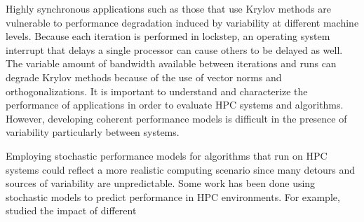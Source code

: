 \documentclass[num-refs]{wiley-article}
\begin{document}
Highly synchronous applications such as those that use Krylov methods are vulnerable to performance degradation induced by variability at different machine levels. 
Because each iteration is performed in lockstep, an operating system interrupt that delays a single processor can cause others to be delayed as well.
The variable amount of bandwidth available between iterations and runs can degrade Krylov methods because of the use of vector norms and orthogonalizations.
It is important to understand and characterize the performance of applications in order to evaluate HPC systems and algorithms. 
However, developing coherent performance models is difficult in the presence of variability \cite{beckman2006influence, HoeflerLumsdaineRehm07} particularly between systems. 

Employing stochastic performance models for algorithms that run on HPC systems could reflect a more realistic computing scenario since many detours and sources of variability are unpredictable.
Some work has been done using stochastic models to predict performance in HPC environments. 
For example, \cite{agarwal2005impact} studied the impact of different
\end{document}
